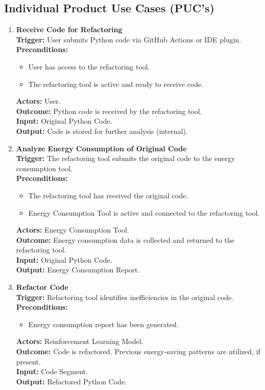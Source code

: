 \documentclass[12pt]{article}
\begin{document}
\subsection{Individual Product Use Cases (PUC's)}
\setlength{\parindent}{0pt}
\begin{enumerate}[label={\bf PUC \arabic*:}, wide=0pt, font=\itshape]
\item {\bf Receive Code for Refactoring} \\[2mm]
\textbf{Trigger:} User submits Python code via GitHub Actions or IDE plugin. \\[2mm]
\textbf{Preconditions:}
\begin{itemize}
    \item User has access to the refactoring tool.
    \item The refactoring tool is active and ready to receive code.
\end{itemize}
\textbf{Actors:} User. \\
\textbf{Outcome:} Python code is received by the refactoring tool. \\
\textbf{Input:} Original Python Code. \\
\textbf{Output:} Code is stored for further analysis (internal).

\item \textbf{Analyze Energy Consumption of Original Code} \\[2mm]
\textbf{Trigger:} The refactoring tool submits the original code to the energy consumption tool. \\[2mm]
\textbf{Preconditions:}
\begin{itemize}
    \item The refactoring tool has received the original code.
    \item Energy Consumption Tool is active and connected to the refactoring tool.
\end{itemize}
\textbf{Actors:} Energy Consumption Tool. \\
\textbf{Outcome:} Energy consumption data is collected and returned to the refactoring tool. \\
\textbf{Input:} Original Python Code. \\
\textbf{Output:} Energy Consumption Report.

\item \textbf{Refactor Code} \\[2mm]
\textbf{Trigger:} Refactoring tool identifies inefficiencies in the original code. \\[2mm]
\textbf{Preconditions:}
\begin{itemize}
    \item Energy consumption report has been generated.
\end{itemize}
\textbf{Actors:} Reinforcement Learning Model. \\
\textbf{Outcome:} Code is refactored. Previous energy-saving patterns are utilized, if present. \\
\textbf{Input:} Code Segment. \\
\textbf{Output:} Refactored Python Code.


\end{enumerate}
\end{document}
